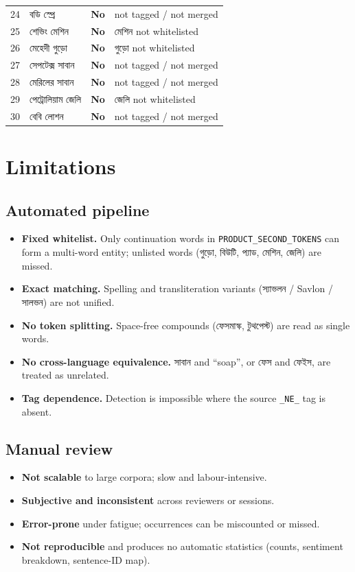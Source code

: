 \documentclass[11pt]{article}
\newcommand{\bn}[1]{{\bnfont #1}}
\newcommand{\no}{\textcolor{codered}{\textbf{No}}}
\begin{document}
\begin{center}
\begin{longtable}{@{}rlcl@{}}
24 & \bn{বডি স্প্রে}        & \no  & not tagged / not merged \\
25 & \bn{শেভিং মেশিন}       & \no  & \bn{মেশিন} not whitelisted \\
26 & \bn{মেহেদী গুড়ো}      & \no  & \bn{গুড়ো} not whitelisted \\
27 & \bn{সেপটেক্স সাবান}    & \no  & not tagged / not merged \\
28 & \bn{মেরিলের সাবান}     & \no  & not tagged / not merged \\
29 & \bn{পেট্রোলিয়াম জেলি} & \no  & \bn{জেলি} not whitelisted \\
30 & \bn{বেবি লোশন}         & \no  & not tagged / not merged \\
\bottomrule
\end{longtable}
\end{center}

\section{Limitations}

\subsection{Automated pipeline}
\begin{itemize}
  \item \textbf{Fixed whitelist.} Only continuation words in
        \texttt{PRODUCT\_SECOND\_TOKENS} can form a multi-word entity; unlisted
        words (\bn{গুড়ো}, \bn{বিউটি}, \bn{প্যাড}, \bn{মেশিন}, \bn{জেলি}) are missed.
  \item \textbf{Exact matching.} Spelling and transliteration variants
        (\bn{স্যাভলন} / Savlon / \bn{সালভন}) are not unified.
  \item \textbf{No token splitting.} Space-free compounds (\bn{ফেসমাস্ক},
        \bn{টুথপেস্ট}) are read as single words.
  \item \textbf{No cross-language equivalence.} \bn{সাবান} and ``soap'', or
        \bn{ফেস} and \bn{ফেইস}, are treated as unrelated.
  \item \textbf{Tag dependence.} Detection is impossible where the source
        \texttt{\_NE\_} tag is absent.
\end{itemize}

\subsection{Manual review}
\begin{itemize}
  \item \textbf{Not scalable} to large corpora; slow and labour-intensive.
  \item \textbf{Subjective and inconsistent} across reviewers or sessions.
  \item \textbf{Error-prone} under fatigue; occurrences can be miscounted or missed.
  \item \textbf{Not reproducible} and produces no automatic statistics
        (counts, sentiment breakdown, sentence-ID map).
\end{itemize}
\end{document}
